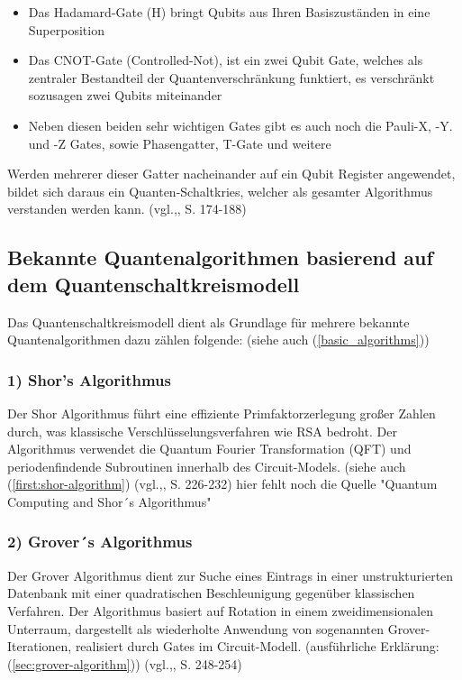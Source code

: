 \begin{itemize}
    \item Das Hadamard-Gate (H) bringt Qubits aus Ihren Basiszuständen in eine Superposition 
    \item Das CNOT-Gate (Controlled-Not), ist ein zwei Qubit Gate, welches als zentraler Bestandteil der Quantenverschränkung funktiert, es verschränkt sozusagen zwei Qubits miteinander 
    \item Neben diesen beiden sehr wichtigen Gates gibt es auch noch die Pauli-X, -Y. und -Z Gates, sowie Phasengatter, T-Gate  und weitere 
\end{itemize}
Werden mehrerer dieser Gatter nacheinander auf ein Qubit Register angewendet, bildet sich daraus ein Quanten-Schaltkries, welcher als gesamter Algorithmus verstanden werden kann.
(vgl.\citeauthor{nielsen_quantum_2010},\citeyear{nielsen_quantum_2010}, S. 174-188)
\subsection*{Bekannte Quantenalgorithmen basierend auf dem Quantenschaltkreismodell}
Das Quantenschaltkreismodell dient als Grundlage für mehrere bekannte Quantenalgorithmen dazu zählen folgende: (siehe auch (\autoref{basic_algorithms}))
\subsubsection*{1) Shor's Algorithmus}
Der Shor Algorithmus führt eine effiziente Primfaktorzerlegung großer Zahlen durch, was klassische Verschlüsselungsverfahren wie RSA bedroht. Der Algorithmus verwendet die Quantum Fourier Transformation (QFT) und periodenfindende Subroutinen innerhalb des Circuit-Models. (siehe auch (\autoref{first:shor-algorithm}) (vgl.\citeauthor{nielsen_quantum_2010},\citeyear{nielsen_quantum_2010}, S. 226-232) hier fehlt noch die Quelle "Quantum Computing  and Shor´s Algorithmus"
\subsubsection*{2) Grover´s Algorithmus}
Der Grover Algorithmus dient zur Suche eines Eintrags in einer unstrukturierten Datenbank mit einer quadratischen Beschleunigung gegenüber klassischen Verfahren.
Der Algorithmus basiert auf Rotation in einem zweidimensionalen Unterraum, dargestellt als wiederholte Anwendung von sogenannten Grover-Iterationen, realisiert durch Gates im Circuit-Modell. (ausführliche Erklärung: (\autoref{sec:grover-algorithm}))  (vgl.\citeauthor{nielsen_quantum_2010},\citeyear{nielsen_quantum_2010}, S. 248-254)

